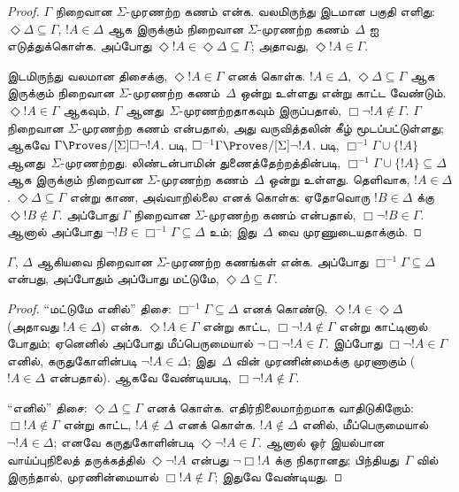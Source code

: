 \documentclass[../../../include/open-logic-section]{subfiles}
\begin{document}
{\begin{proof}
  $\Gamma$ நிறைவான $\Sigma$-முரணற்ற கணம் என்க. வலமிருந்து இடமான பகுதி
  எளிது: $\Diamond\Delta \subseteq \Gamma$, $!A \in \Delta$ ஆக
  இருக்கும் நிறைவான $\Sigma$-முரணற்ற கணம்~$\Delta$ ஐ எடுத்துக்கொள்க.
  அப்போது $\Diamond!A \in \Diamond\Delta \subseteq \Gamma$; அதாவது,
  $\Diamond!A \in \Gamma$.

  இடமிருந்து வலமான திசைக்கு, $\Diamond !A \in \Gamma$ எனக் கொள்க.
  $!A \in \Delta$, $\Diamond\Delta \subseteq \Gamma$ ஆக இருக்கும்
  நிறைவான $\Sigma$-முரணற்ற கணம்~$\Delta$ ஒன்று உள்ளது என்று காட்ட வேண்டும்.
  $\Diamond !A \in \Gamma$ ஆகவும், $\Gamma$ ஆனது~$\Sigma$-முரணற்றதாகவும்
  இருப்பதால், $\Box\lnot !A \notin \Gamma$. $\Gamma$ நிறைவான
  $\Sigma$-முரணற்ற கணம் என்பதால், அது வருவித்தலின் கீழ் மூடப்பட்டுள்ளது;
  ஆகவே $\Gamma \Proves/[\Sigma] \Box\lnot !A$.  படி,
  $\Box^{-1}\Gamma \Proves/[\Sigma] \lnot !A$.
  படி, $\Box^{-1}\Gamma \cup \{ !A \}$ ஆனது~$\Sigma$-முரணற்றது.
  லிண்டன்பாமின் துணைத்தேற்றத்தின்படி, $\Box^{-1}\Gamma \cup \{ !A \}
  \subseteq \Delta$ ஆக இருக்கும் நிறைவான $\Sigma$-முரணற்ற கணம்~$\Delta$
  ஒன்று உள்ளது. தெளிவாக, $!A \in \Delta$. $\Diamond\Delta \subseteq
  \Gamma$ என்று காண, அவ்வாறில்லை எனக் கொள்க: ஏதோவொரு $!B \in \Delta$
  க்கு $\Diamond !B \notin \Gamma$. அப்போது $\Gamma$ நிறைவான
  $\Sigma$-முரணற்ற கணம் என்பதால், $\Box\lnot !B \in \Gamma$. ஆனால்
  அப்போது $\lnot !B \in \Box^{-1}\Gamma \subseteq \Delta$ உம்;
  இது~$\Delta$ வை முரணுடையதாக்கும்.
\end{proof}
}

\begin{lem}
  $\Gamma$, $\Delta$ ஆகியவை நிறைவான $\Sigma$-முரணற்ற கணங்கள் என்க.
  அப்போது $\Box^{-1}\Gamma \subseteq \Delta$ என்பது, அப்போதும் அப்போது
  மட்டுமே, $\Diamond\Delta \subseteq \Gamma$.
\end{lem}

\begin{proof}
  “மட்டுமே எனில்” திசை: $\Box^{-1}\Gamma \subseteq \Delta$ எனக் கொண்டு,
  $\Diamond!A \in \Diamond\Delta$ (அதாவது $!A \in \Delta$) என்க.
  $\Diamond!A \in \Gamma$ என்று காட்ட, $\Box\lnot!A \notin \Gamma$
  என்று காட்டினால் போதும்; ஏனெனில் அப்போது மீப்பெருமையால்
  $\lnot\Box\lnot !A \in \Gamma$. இப்போது $\Box\lnot!A \in \Gamma$
  எனில், கருதுகோளின்படி $\lnot!A \in \Delta$; இது~$\Delta$ வின்
  முரணின்மைக்கு முரணாகும் ($!A \in \Delta$ என்பதால்). ஆகவே வேண்டியபடி,
  $\Box\lnot!A \notin \Gamma$.

  “எனில்” திசை: $\Diamond\Delta \subseteq \Gamma$ எனக் கொள்க.
  எதிர்நிலைமாற்றமாக வாதிடுகிறோம்: $\Box!A \notin \Gamma$ என்று காட்ட,
  $!A \notin \Delta$ எனக் கொள்க. $!A \notin \Delta$ எனில்,
  மீப்பெருமையால் $\lnot!A \in \Delta$; எனவே கருதுகோளின்படி
  $\Diamond\lnot!A \in \Gamma$. ஆனால் ஓர் இயல்பான வாய்ப்புநிலைத்
  தருக்கத்தில் $\Diamond\lnot!A$ என்பது $\lnot\Box !A$ க்கு நிகரானது;
  பிந்தியது~$\Gamma$ வில் இருந்தால், முரணின்மையால்
  $\Box!A \notin\Gamma$; இதுவே வேண்டியது.
\end{proof}
\end{document}
